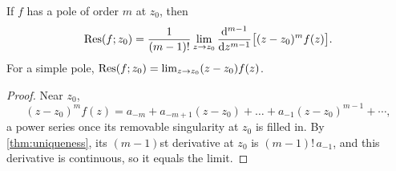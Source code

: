 \begin{theorem}\label{thm:residue-at-pole}
  If $f$ has a pole of order $m$ at $z_0$, then
  \[
    \operatorname{Res}(f; z_0) = \frac{1}{(m-1)!} \lim_{z \to z_0}
      \frac{\mathop{}\!\mathrm{d}^{m-1}}{\mathop{}\!\mathrm{d} z^{m-1}} \bigl[ (z - z_0)^m f(z) \bigr].
  \]
  For a simple pole, $\operatorname{Res}(f; z_0) = \lim_{z \to z_0} (z - z_0) f(z)$.
\end{theorem}

\begin{proof}
  Near $z_0$,
  \[
    (z - z_0)^m f(z)
    = a_{-m} + a_{-m+1}(z - z_0) + \dots + a_{-1}(z - z_0)^{m-1} + \dotsb,
  \]
  a power series once its removable singularity at $z_0$ is filled in. By
  \cref{thm:uniqueness}, its $(m-1)$st derivative at $z_0$ is
  $(m-1)! \, a_{-1}$, and this derivative is continuous, so it equals the limit.
\end{proof}
